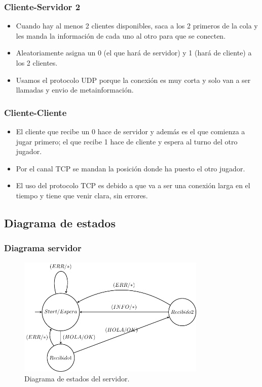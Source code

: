 \documentclass{beamer}
\begin{document}
\begin{frame}
	\frametitle{Cliente-Servidor 2}
	\begin{itemize}
		\item Cuando hay al menos 2 clientes disponibles, saca a los 2 primeros de la cola y les manda la información de cada uno al otro para que se conecten.
		\pause
		\item Aleatoriamente asigna un 0 (el que hará de servidor) y 1 (hará de cliente) a los 2 clientes.
		\item Usamos el protocolo UDP porque la conexión es muy corta y solo van a ser llamadas y envio de metainformación.
	\end{itemize}
\end{frame}

\begin{frame}
	\frametitle{Cliente-Cliente}
	\begin{itemize}
		\item El cliente que recibe un 0 hace de servidor y además es el que comienza a jugar primero; el que recibe 1 hace de cliente y espera al turno del otro jugador.
		\pause
		\item Por el canal TCP se mandan la posición donde ha puesto el otro jugador.
		\pause
		\item El uso del protocolo TCP es debido a que va a ser una conexión larga en el tiempo y tiene que venir clara, sin errores.
	\end{itemize}
\end{frame}

\subsection{Diagrama de estados}
\begin{frame}
	\frametitle{Diagrama servidor}
	\begin{figure}[H]
    \centering
    \includegraphics[width=0.8\textwidth]{Diagrama.pdf}
    \caption{Diagrama de estados del servidor.}
\end{figure}
\end{frame}
\end{document}
